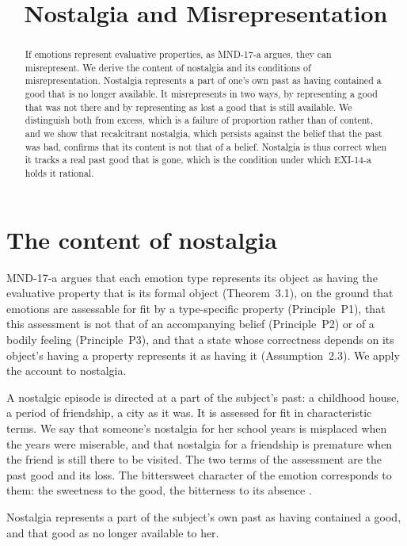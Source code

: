 \documentclass{situationist-preprint}
\title{Nostalgia and Misrepresentation}
\begin{document}
\maketitle

\begin{abstract}
If emotions represent evaluative properties, as MND-17-a argues, they can misrepresent. We derive the content of nostalgia and its conditions of misrepresentation. Nostalgia represents a part of one's own past as having contained a good that is no longer available. It misrepresents in two ways, by representing a good that was not there and by representing as lost a good that is still available. We distinguish both from excess, which is a failure of proportion rather than of content, and we show that recalcitrant nostalgia, which persists against the belief that the past was bad, confirms that its content is not that of a belief. Nostalgia is thus correct when it tracks a real past good that is gone, which is the condition under which EXI-14-a holds it rational.
\end{abstract}

\section{The content of nostalgia}

MND-17-a argues that each emotion type represents its object as having the evaluative property that is its formal object (Theorem~3.1), on the ground that emotions are assessable for fit by a type-specific property (Principle~P1), that this assessment is not that of an accompanying belief (Principle~P2) or of a bodily feeling (Principle~P3), and that a state whose correctness depends on its object's having a property represents it as having it (Assumption~2.3). We apply the account to nostalgia.

A nostalgic episode is directed at a part of the subject's past: a childhood house, a period of friendship, a city as it was. It is assessed for fit in characteristic terms. We say that someone's nostalgia for her school years is misplaced when the years were miserable, and that nostalgia for a friendship is premature when the friend is still there to be visited. The two terms of the assessment are the past good and its loss. The bittersweet character of the emotion corresponds to them: the sweetness to the good, the bitterness to its absence \citep{Sedikides2008}.

\begin{proposition}\label{p:content}
Nostalgia represents a part of the subject's own past as having contained a good, and that good as no longer available to her.
\end{proposition}
\end{document}

